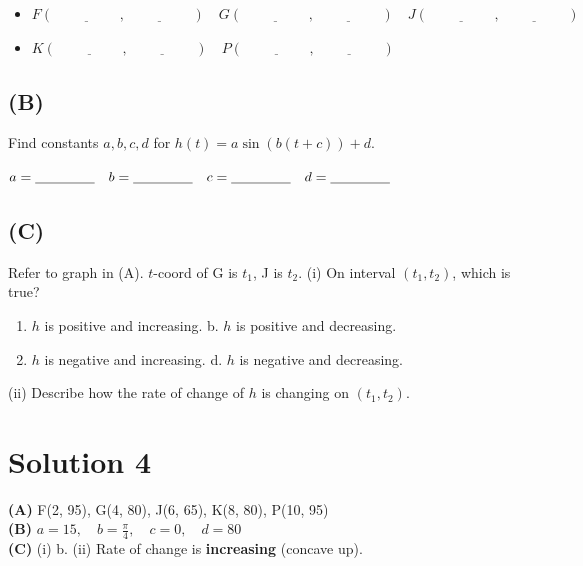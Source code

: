 \documentclass[12pt]{article}
\begin{document}
\begin{itemize}[label={}]
    \item $F(\underline{\hspace{2cm}}, \underline{\hspace{2cm}}) \quad G(\underline{\hspace{2cm}}, \underline{\hspace{2cm}}) \quad J(\underline{\hspace{2cm}}, \underline{\hspace{2cm}})$
    \item $K(\underline{\hspace{2cm}}, \underline{\hspace{2cm}}) \quad P(\underline{\hspace{2cm}}, \underline{\hspace{2cm}})$
\end{itemize}

\subsection*{(B)}
Find constants $a, b, c, d$ for $h(t) = a \sin(b(t+c)) + d$.

\vspace{0.5em}
$a = \underline{\hspace{1.5cm}} \quad b = \underline{\hspace{1.5cm}} \quad c = \underline{\hspace{1.5cm}} \quad d = \underline{\hspace{1.5cm}}$

\subsection*{(C)}
Refer to graph in (A). $t$-coord of G is $t_1$, J is $t_2$.
(i) On interval $(t_1, t_2)$, which is true?
\begin{enumerate}[label=\alph*.]
    \item $h$ is positive and increasing. \hfill b. $h$ is positive and decreasing.
    \item $h$ is negative and increasing. \hfill d. $h$ is negative and decreasing.
\end{enumerate}
(ii) Describe how the rate of change of $h$ is changing on $(t_1, t_2)$.
\vspace{1.5cm}

\newpage
\section*{Solution 4}
\textbf{(A)} F(2, 95), G(4, 80), J(6, 65), K(8, 80), P(10, 95) \\
\textbf{(B)} $a = 15, \quad b = \frac{\pi}{4}, \quad c = 0, \quad d = 80$ \\
\textbf{(C)} (i) b. (ii) Rate of change is \textbf{increasing} (concave up).
\end{document}
